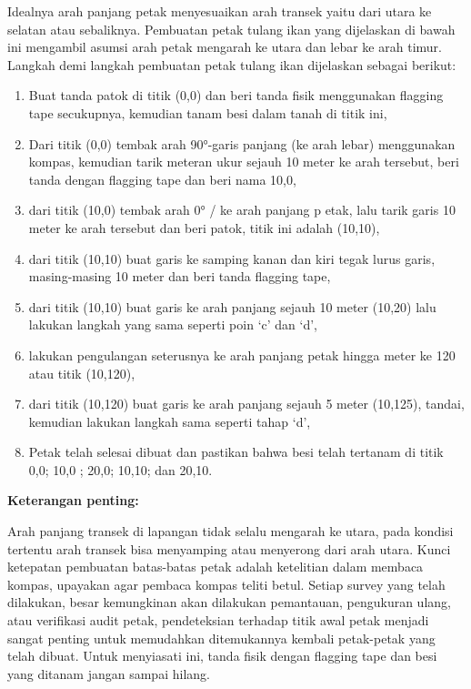 \documentclass[
  oneside]{book}
\begin{document}
Idealnya arah panjang petak menyesuaikan arah transek yaitu dari utara ke selatan atau sebaliknya. Pembuatan petak tulang ikan yang dijelaskan di bawah ini mengambil asumsi arah petak mengarah ke utara dan lebar ke arah timur. Langkah demi langkah pembuatan petak tulang ikan dijelaskan sebagai berikut:

\begin{enumerate}
\def\labelenumi{\alph{enumi})}
\item
  Buat tanda patok di titik (0,0) dan beri tanda fisik menggunakan flagging tape secukupnya, kemudian tanam besi dalam tanah di titik ini,
\item
  Dari titik (0,0) tembak arah 90°-garis panjang (ke arah lebar) menggunakan kompas, kemudian tarik meteran ukur sejauh 10 meter ke arah tersebut, beri tanda dengan flagging tape dan beri nama 10,0,
\item
  dari titik (10,0) tembak arah 0° / ke arah panjang p etak, lalu tarik garis 10 meter ke arah tersebut dan beri patok, titik ini adalah (10,10),
\item
  dari titik (10,10) buat garis ke samping kanan dan kiri tegak lurus garis, masing-masing 10 meter dan beri tanda flagging tape,
\item
  dari titik (10,10) buat garis ke arah panjang sejauh 10 meter (10,20) lalu lakukan langkah yang sama seperti poin `c' dan `d',
\item
  lakukan pengulangan seterusnya ke arah panjang petak hingga meter ke 120 atau titik (10,120),
\item
  dari titik (10,120) buat garis ke arah panjang sejauh 5 meter (10,125), tandai, kemudian lakukan langkah sama seperti tahap `d',
\item
  Petak telah selesai dibuat dan pastikan bahwa besi telah tertanam di titik 0,0; 10,0 ; 20,0; 10,10; dan 20,10.
\end{enumerate}

\textbf{Keterangan penting:}

Arah panjang transek di lapangan tidak selalu mengarah ke utara, pada kondisi tertentu arah transek bisa menyamping atau menyerong dari arah utara. Kunci ketepatan pembuatan batas-batas petak adalah ketelitian dalam membaca kompas, upayakan agar pembaca kompas teliti betul. Setiap survey yang telah dilakukan, besar kemungkinan akan dilakukan pemantauan, pengukuran ulang, atau verifikasi audit petak, pendeteksian terhadap titik awal petak menjadi sangat penting untuk memudahkan ditemukannya kembali petak-petak yang telah dibuat. Untuk menyiasati ini, tanda fisik dengan flagging tape dan besi yang ditanam jangan sampai hilang.
\end{document}
